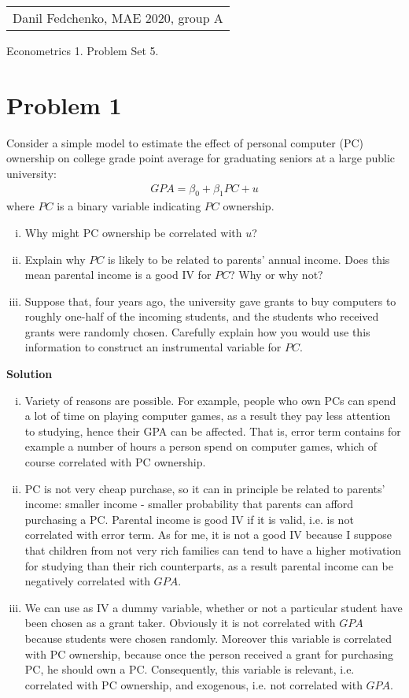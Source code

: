 \documentclass[a4paper]{article}
\begin{document}
	\begin{flushright}
	\begin{tabular}{r}
		Danil Fedchenko, MAE 2020, group A \\
	\end{tabular}
\end{flushright}


\begin{center}
	Econometrics 1. Problem Set 5.
\end{center}
\section*{Problem 1}
Consider a simple model to estimate the effect of personal computer (PC) ownership on
college grade point average for graduating seniors at a large public university:
\begin{align*}
GPA = \beta_0 + \beta_1 PC + u
\end{align*}
where $PC$ is a binary variable indicating $PC$ ownership.
\begin{enumerate}[(i)]
\item Why might PC ownership be correlated with $u$?
\item Explain why $PC$ is likely to be related to parents’ annual income. Does this mean
parental income is a good IV for $PC$? Why or why not?
\item Suppose that, four years ago, the university gave grants to buy computers to roughly
one-half of the incoming students, and the students who received grants were randomly chosen.
Carefully explain how you would use this information to construct an instrumental variable for
$PC$.
\end{enumerate}


\textbf{Solution}


\begin{enumerate}[(i)]
	\item Variety of reasons are possible. For example, people who own PCs can spend a lot of time on playing computer games, as a result they pay less attention to studying, hence their GPA can be affected. That is, error term contains for example a number of hours a person spend on computer games, which of course correlated with PC ownership.
	\item PC is not very cheap purchase, so it can in principle be related to parents' income: smaller income - smaller probability that parents can afford purchasing a PC. Parental income is good IV if it is valid, i.e. is not correlated with error term. As for me, it is not a good IV because I suppose that children from not very rich families can tend to have a higher motivation for studying than their rich counterparts, as a result parental income can be negatively correlated with $GPA$.
	\item We can use as IV a dummy variable, whether or not a particular student have been chosen as a grant taker. Obviously it is not correlated with $GPA$ because students were chosen randomly. Moreover this variable is correlated with PC ownership, because once the person received a grant for purchasing PC, he should own a PC. Consequently, this variable is relevant, i.e. correlated with PC ownership, and exogenous, i.e. not correlated with $GPA$.
\end{enumerate}
\end{document}
